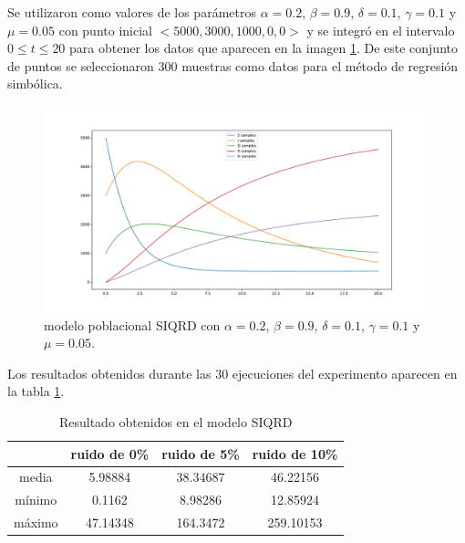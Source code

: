 Se utilizaron como valores de los parámetros $\alpha = 0.2$, $\beta = 0.9$, $\delta = 0.1$, $\gamma = 0.1$ y $\mu = 0.05$ con punto inicial $<5000, 3000, 1000, 0, 0>$ y se integró en el intervalo $0 \leq t \leq 20$ para obtener los datos que aparecen en la imagen \ref{fig:SIQRD}. De este conjunto de puntos se seleccionaron 300 muestras como datos para el método de regresión simbólica.

\begin{figure}[h]
    \centering
    \includegraphics[width=\textwidth]{"figures/SIQRD.pdf"}
    \caption{modelo poblacional SIQRD con $\alpha = 0.2$, $\beta = 0.9$, $\delta = 0.1$, $\gamma = 0.1$ y $\mu = 0.05$.}
    \label{fig:SIQRD}
\end{figure}

Los resultados obtenidos durante las 30 ejecuciones del experimento aparecen en la tabla \ref{table:experiment_SIQRD}.

\begin{table}[!h]
    \centering
    \caption{Resultado obtenidos en el modelo SIQRD}
    \begin{tabular}{|c|c|c|c|}
        \hline
               & \textbf{ruido de 0\%} & \textbf{ruido de 5\%} & \textbf{ruido de 10\%} \\
        \hline
        media  & 5.98884               & 38.34687              & 46.22156               \\
        \hline
        mínimo & 0.1162                & 8.98286               & 12.85924               \\
        \hline
        máximo & 47.14348              & 164.3472              & 259.10153              \\
        \hline
    \end{tabular}
    \label{table:experiment_SIQRD}
\end{table}



